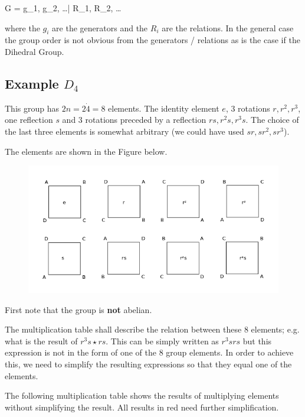 \bee
G = \langle g_1, g_2, \ldots | R_1, R_2, \ldots \rangle
\eee

where the $g_i$ are the generators and the $R_i$ are the relations. In the general case the group order is not obvious from the generators / relations as is the case if the Dihedral Group. 

\subsection{Example $D_4$}

This group has $2n = 2 \dot 4 = 8$ elements. The identity element $e$, $3$ rotations $r, r^2, r^3$, one reflection $s$ and $3$ rotations preceded by a reflection $rs, r^2s, r^3s$. The choice of the last three elements is somewhat arbitrary (we could have used $sr, sr^2, sr^3$).

The elements are shown in the Figure below.

\begin{figure}[H]
\centering
\includegraphics[scale=0.6]{images/groups_04_3.png}
\end{figure}

First note that the group is \textbf{not} abelian.

The multiplication table shall describe the relation between these $8$ elements; e.g. what is the result of $r^3s \star rs$. This can be simply written as $r^3srs$ but this expression is not in the form of one of the $8$ group elements. In order to achieve this, we need to simplify the resulting expressions so that they equal one of the elements.

The following multiplication table shows the results of multiplying elements without simplifying the result. All results in red need further simplification.

